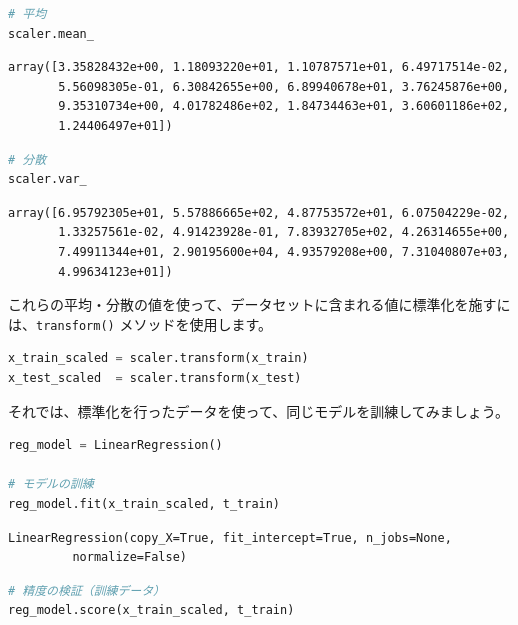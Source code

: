 \begin{lstlisting}[style=codecell,language=Python]
# 平均
scaler.mean_
\end{lstlisting}

\begin{lstlisting}[style=outputcell]
array([3.35828432e+00, 1.18093220e+01, 1.10787571e+01, 6.49717514e-02,
       5.56098305e-01, 6.30842655e+00, 6.89940678e+01, 3.76245876e+00,
       9.35310734e+00, 4.01782486e+02, 1.84734463e+01, 3.60601186e+02,
       1.24406497e+01])
\end{lstlisting}

\begin{lstlisting}[style=codecell,language=Python]
# 分散
scaler.var_
\end{lstlisting}

\begin{lstlisting}[style=outputcell]
array([6.95792305e+01, 5.57886665e+02, 4.87753572e+01, 6.07504229e-02,
       1.33257561e-02, 4.91423928e-01, 7.83932705e+02, 4.26314655e+00,
       7.49911344e+01, 2.90195600e+04, 4.93579208e+00, 7.31040807e+03,
       4.99634123e+01])
\end{lstlisting}

これらの平均・分散の値を使って、データセットに含まれる値に標準化を施すには、\texttt{transform()} メソッドを使用します。


\begin{lstlisting}[style=codecell,language=Python]
x_train_scaled = scaler.transform(x_train)
x_test_scaled  = scaler.transform(x_test)
\end{lstlisting}

それでは、標準化を行ったデータを使って、同じモデルを訓練してみましょう。


\begin{lstlisting}[style=codecell,language=Python]
reg_model = LinearRegression()

# モデルの訓練
reg_model.fit(x_train_scaled, t_train)
\end{lstlisting}

\begin{lstlisting}[style=outputcell]
LinearRegression(copy_X=True, fit_intercept=True, n_jobs=None,
         normalize=False)
\end{lstlisting}

\begin{lstlisting}[style=codecell,language=Python]
# 精度の検証（訓練データ）
reg_model.score(x_train_scaled, t_train)
\end{lstlisting}


